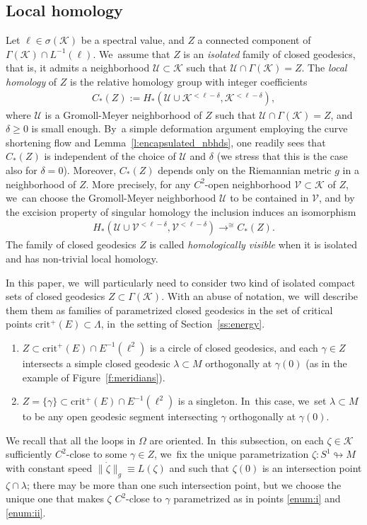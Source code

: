 \documentclass[JEP,XML,SOM,Unicode,NoFloatCountersInSection,published]{cedram}
\newcommand{\KK}{\mathcal{K}}
\newcommand{\UU}{\mathcal{U}}
\newcommand{\VV}{\mathcal{V}}
\newcommand{\crit}{\mathrm{crit}}
\DeclareMathOperator*{\toup}{\longrightarrow}
\let\ttoup\toup
\theoremstyle{plain}
\theoremstyle{definition}
\begin{document}
\subsection{Local homology}\label{ss:hom_visible}
Let $\ell\in\sigma(\KK)$ be a spectral value, and $Z$ a connected component of $\Gamma(\KK)\cap L^{-1}(\ell)$. We~assume that $Z$ is an \emph{isolated} family of closed geodesics, that is, it admits a neighborhood $\UU\subset\KK$ such that $\UU\cap\Gamma(\KK)=Z$.
The \emph{local homology} of $Z$ is the relative homology group with integer coefficients
\begin{align*}
C_*(Z)
:=
H_*(\UU\cup\KK{}^{<\ell-\delta},\KK{}^{<\ell-\delta}),
\end{align*}
where $\UU$ is a Gromoll-Meyer neighborhood of $Z$ such that $\UU\cap\Gamma(\KK)=Z$, and $\delta\geq0$ is small enough. By~a simple deformation argument employing the curve shortening flow and Lemma~\ref{l:encapsulated_nbhds}, one readily sees that $C_*(Z)$ is independent of the choice of $\UU$ and $\delta$ (we stress that this is the case also for $\delta=0$). Moreover, $C_*(Z)$ depends only on the Riemannian metric $g$ in a neighborhood of $Z$. More precisely, for any $C^2$-open neighborhood $\VV\subset\KK$ of $Z$, we~can choose the Gromoll-Meyer neighborhood $\UU$ to be contained in $\VV$, and by the excision property of singular homology the inclusion induces an isomorphism
\begin{align*}
H_*(\UU\cup\VV^{<\ell-\delta},\VV^{<\ell-\delta})
\ttoup^{\cong}
C_*(Z).
\end{align*}
The family of closed geodesics $Z$ is called \emph{homologically visible} when it is isolated and has non-trivial local homology.

In this paper, we~will particularly need to consider two kind of isolated compact sets of closed geodesics $Z\subset\Gamma(\KK)$. With an abuse of notation, we~will describe them them as families of parametrized closed geodesics in the set of critical points $\crit^+(E)\subset\Lambda$, in~the setting of Section~\ref{ss:energy}.

\begin{enumerate}
\item\label{enum:i}
$Z\subset\crit^+(E)\cap E^{-1}(\ell^2)$ is a circle of closed geodesics, and each $\gamma\in Z$ intersects a simple closed geodesic $\lambda\subset M$ orthogonally at $\gamma(0)$ (as in the example of Figure~\ref{f:meridians}).

\item\label{enum:ii}
$Z=\{\gamma\}\subset\crit^+(E)\cap E^{-1}(\ell^2)$ is a singleton. In~this case, we~set $\lambda\subset M$ to be any open geodesic segment intersecting $\gamma$ orthogonally at $\gamma(0)$.
\end{enumerate}
We recall that all the loops in $\Omega$ are oriented. In~this subsection, on each $\zeta\in\KK$ sufficiently $C^2$-close to some $\gamma\in Z$, we~fix the unique parametrization $\zeta:S^1\looparrowright M$ with constant speed $\|\dot\zeta\|_g\equiv L(\zeta)$ and such that $\zeta(0)$ is an intersection point $\zeta\cap\lambda$; there may be more than one such intersection point, but we choose the unique one that makes $\zeta$ $C^2$-close to $\gamma$ parametrized as in points \eqref{enum:i} and \eqref{enum:ii}.
\end{document}
